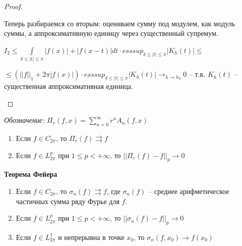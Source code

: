 \begin{proof}
\begin{enumerate}
{            Теперь разбираемся со вторым: оцениваем сумму под модулем, как модуль суммы, а аппроксимативную единицу через существенный супремум.
            
            $I_2 \leq \int\limits_{\delta \leqslant |t| \leqslant \pi} |f(x)| + |f(x - t)| dt \cdot esssup_{\delta \leqslant |t| \leqslant \pi} |K_h(t)| \leq$
            
            $\leq \left( ||f||_1 + 2\pi |f(x)| \right) \cdot esssup_{\delta \leqslant |t| \leqslant \pi} |K_h(t)| \to_{h \to h_0} 0$ -- т.к. $K_h(t)$ -- существенная аппроксимативная единица.
        }
    \end{enumerate}
\end{proof}

\begin{consequence}
    \textit{Обозначение:} $\Pi_r(f, x) = \sum_{n=0}^{\infty} r^n A_n(f, x)$


    \begin{enumerate}
        \item Если $f \in C_{2\pi}$, то $\Pi_r (f) \rightrightarrows f$
        \item Если $f \in L_{2\pi}^p$ при $1 \leqslant p < +\infty$, то $||\Pi_r (f) - f||_p \rightarrow 0$
    \end{enumerate}
\end{consequence}

\begin{theorem}
\textbf{Теорема Фейера}

    \begin{enumerate}
        \item Если $f \in C_{2\pi}$, то $\sigma_n (f) \rightrightarrows f$, где $\sigma_n(f)$ -- среднее арифметическое частичных сумма ряду Фурье для $f$.
        \item Если $f \in L_{2\pi}^p$ при $1 \leqslant p < +\infty$, то $||\sigma_n (f) - f||_p \rightarrow 0$
        \item Если $f \in L_{2\pi}^1$ и непрерывна в точке $x_0$, то $\sigma_n (f, x_0) \rightarrow f(x_0)$
    \end{enumerate}
\end{theorem}


